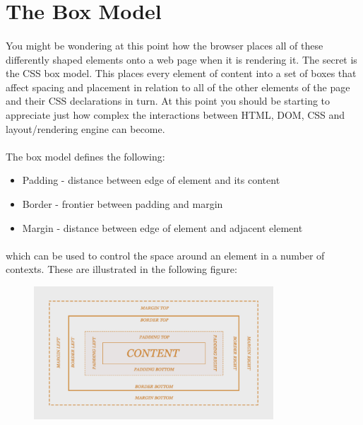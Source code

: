 \section{The Box Model}
\paragraph{} You might be wondering at this point how the browser places all of these differently shaped elements onto a web page when it is rendering it. The secret is the CSS box model. This places every element of content into a set of boxes that affect spacing and placement in relation to all of the other elements of the page and their CSS declarations in turn. At this point you should be starting to appreciate just how complex the interactions between HTML, DOM, CSS and layout/rendering engine can become.
\paragraph{} The box model defines the following:

\begin{itemize}
	\item Padding - distance between edge of element and its content 
	\item Border - frontier between padding and margin
	\item Margin - distance between edge of element and adjacent element
\end{itemize}

\paragraph{} which can be used to control the space around an element in a number of contexts. These are illustrated in the following figure:

\begin{figure}[H]
\centering
\includegraphics[width=0.8\textwidth]{figures/box-model}
\label{fig:box-model}
\caption{}
\end{figure}


